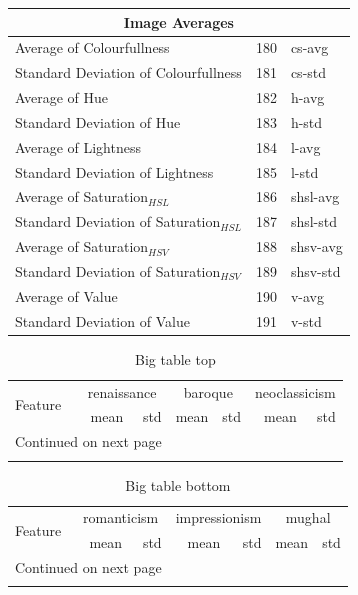 \documentclass[11pt,a4paper,draft]{report}
\begin{document}
\begin{center}
\begin{longtable}{|l|c|l|}
\midrule
\multicolumn{3}{c}{Image Averages} \\
\midrule
Average of Colourfullness & 180 & cs-avg \\
Standard Deviation of Colourfullness & 181 & cs-std \\
Average of Hue & 182 & h-avg \\
Standard Deviation of Hue & 183 & h-std \\
Average of Lightness & 184 & l-avg \\
Standard Deviation of Lightness & 185 & l-std \\
Average of Saturation$_{HSL}$ & 186 & shsl-avg \\
Standard Deviation of Saturation$_{HSL}$ & 187 & shsl-std \\
Average of Saturation$_{HSV}$ & 188 & shsv-avg \\
Standard Deviation of Saturation$_{HSV}$ & 189 & shsv-std \\
Average of Value & 190 & v-avg \\
Standard Deviation of Value & 191 & v-std \\
\bottomrule
\end{longtable}
\end{center}

\newpage

\begin{center}
\footnotesize
\begin{longtable}{l|rr|rr|rr}
\toprule
\multirow{2}{*}{Feature}
  & \multicolumn{2}{c}{renaissance}
  & \multicolumn{2}{c}{baroque}
  & \multicolumn{2}{c}{neoclassicism}
  \\
\cline{2-7}
& mean & std & mean & std & mean & std \\
\midrule
\endhead

\midrule
\multicolumn{3}{r}{{Continued on next page}} \\
\midrule
\endfoot

\bottomrule
\caption{Big table top}
\label{tab:bigtop}
\endlastfoot


\bottomrule
\end{longtable}
\end{center}

\newpage

\begin{center}
\footnotesize
\begin{longtable}{l|rr|rr||rr}
\toprule
\multirow{2}{*}{Feature}
  & \multicolumn{2}{c}{romanticism}
  & \multicolumn{2}{c}{impressionism}
  & \multicolumn{2}{c}{mughal}
  \\
\cline{2-7}
& mean & std & mean & std & mean & std \\
\midrule
\endhead

\midrule
\multicolumn{3}{r}{{Continued on next page}} \\
\midrule
\endfoot

\bottomrule
\caption{Big table bottom}
\label{tab:bigbot}
\endlastfoot


\bottomrule
\end{longtable}
\end{center}
\end{document}
